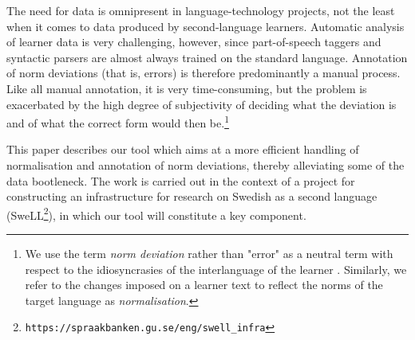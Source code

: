\documentclass[10pt, a4paper]{article}
\newcommand{\normAnn}[0]{our tool }
\begin{document}
The need for data is omnipresent in language-technology projects, not the least when it comes to data produced by second-language learners.
Automatic analysis of learner data is very challenging, however, since part-of-speech taggers and syntactic parsers are almost always trained on the standard language. Annotation of norm deviations (that is, errors) is therefore predominantly a manual process. Like all manual annotation, it is very time-consuming, but the problem is exacerbated by the high degree of subjectivity of deciding what the deviation is and of what the correct form would then be.\footnote{We use the term {\em norm deviation} rather than "error" as a neutral term with respect to the idiosyncrasies of the interlanguage of the learner \cite{Selinker1972}. Similarly, we refer to the changes imposed on a learner text to reflect the norms of the target language as {\em normalisation}. }

This paper describes %
\normAnn which aims at a more efficient handling of normalisation and annotation of norm deviations, thereby alleviating some of the data bootleneck. The work is carried out in the context of a project for constructing an infrastructure for research on Swedish as a second language (SweLL\footnote{%
{\tt https://spraakbanken.gu.se/eng/swell\_infra}}), in which \normAnn will constitute a key component.


\end{document}
